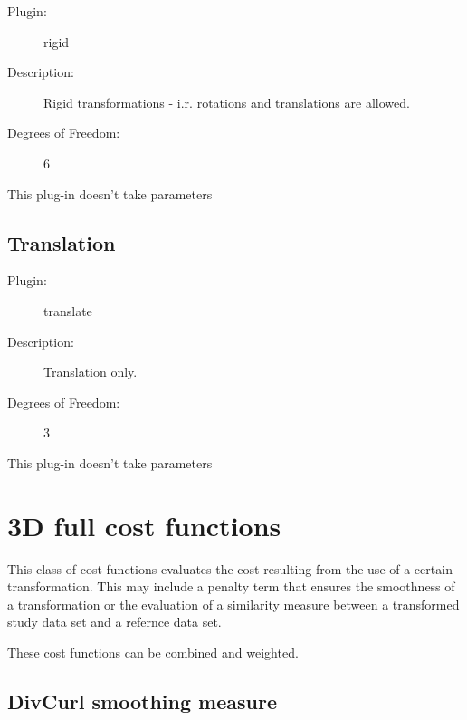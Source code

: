    \begin{description}
   
   \item [Plugin:] rigid
   \item [Description:] Rigid transformations - i.r. rotations and translations are allowed. 
   \item [Degrees of Freedom:] 6 
  
   \end{description}
   This plug-in doesn't take parameters 

   
   \subsection{Translation}
   \label{transform3d:translate}
   
   \begin{description}
   
   \item [Plugin:] translate
   \item [Description:] Translation only.  
   \item [Degrees of Freedom:] 3
  
   \end{description}
   This plug-in doesn't take parameters 

\section{3D full cost functions}  \label{sec:3dfullcost}
  
  This class of cost functions evaluates the cost resulting from the 
  use of a certain transformation. This may include a penalty term that ensures 
  the smoothness of a transformation or the evaluation of a similarity measure 
  between a transformed study data set and a refernce data set. 
  
  These cost functions can be combined and weighted. 
  

      
   \subsection{DivCurl smoothing measure}
   \label{fullcost3d:divcurl}
   
